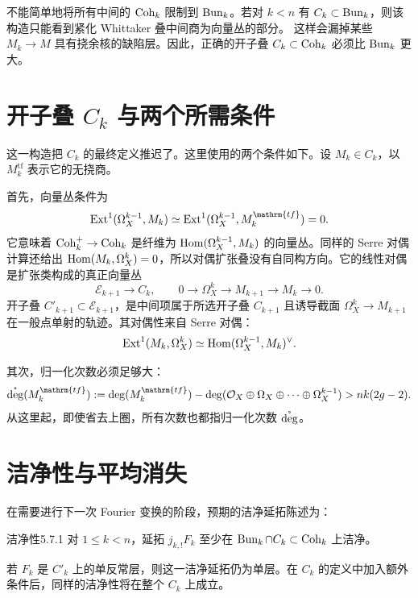 不能简单地将所有中间的 $\operatorname{Coh}_k$ 限制到 $\operatorname{Bun}_k$。若对 $k<n$ 有 $C_k\subset\operatorname{Bun}_k$，则该构造只能看到紧化 Whittaker 叠中间商为向量丛的部分。
这样会漏掉某些 $M_k\to M$ 具有挠余核的缺陷层。因此，正确的开子叠 $C_k\subset\operatorname{Coh}_k$ 必须比 $\operatorname{Bun}_k$ 更大。
\section{开子叠 \texorpdfstring{$C_k$}{Cₖ} 与两个所需条件}\label{sec:5.6}
这一构造把 $C_k$ 的最终定义推迟了。这里使用的两个条件如下。设 $M_k\in C_k$，以 $M_k^{\mathrm{tf}}$ 表示它的无挠商。

首先，向量丛条件为
\[\Ext^1(\Omega_X^{k-1},M_k)\simeq\Ext^1(\Omega_X^{k-1},M_k^{\mathrm{tf}})=0.\]
它意味着 $\operatorname{Coh}_k^+\to\operatorname{Coh}_k$ 是纤维为 $\operatorname{Hom}(\Omega_X^{k-1},M_k)$ 的向量丛。同样的 Serre 对偶计算还给出 $\operatorname{Hom}(M_k,\Omega_X^k)=0$，所以对偶扩张叠没有自同构方向。它的线性对偶是扩张类构成的真正向量丛
\[\mathcal E_{k+1}\longrightarrow C_k,\qquad0\longrightarrow\Omega_X^k\longrightarrow M_{k+1}\longrightarrow M_k\longrightarrow0.\]
开子叠 $C'_{k+1}\subset\mathcal E_{k+1}$，是中间项属于所选开子叠 $C_{k+1}$ 且诱导截面 $\Omega_X^k\to M_{k+1}$ 在一般点单射的轨迹。其对偶性来自 Serre 对偶：
\[\operatorname{Ext}^1(M_k,\Omega_X^k)\simeq\operatorname{Hom}(\Omega_X^{k-1},M_k)^\vee.\]

其次，归一化次数必须足够大：
\[\ndeg(M_k^{\mathrm{tf}}):=\deg(M_k^{\mathrm{tf}})-\deg(\cO_X\oplus\Omega_X\oplus\cdots\oplus\Omega_X^{k-1})>nk(2g-2).\]
从这里起，即使省去上圈，所有次数也都指归一化次数 $\mathring{\deg}$。
\section{洁净性与平均消失}\label{sec:5.7}
在需要进行下一次 Fourier 变换的阶段，预期的洁净延拓陈述为：
\begin{theorem}{洁净性}{5.7.1}
对 $1\le k<n$，延拓 $j_{k,!}F_k$ 至少在 $\operatorname{Bun}_k\cap C_k\subset\operatorname{Coh}_k$ 上洁净。
\end{theorem}
若 $F_k$ 是 $C'_k$ 上的单反常层，则这一洁净延拓仍为单层。在 $C_k$ 的定义中加入额外条件后，同样的洁净性将在整个 $C_k$ 上成立。

